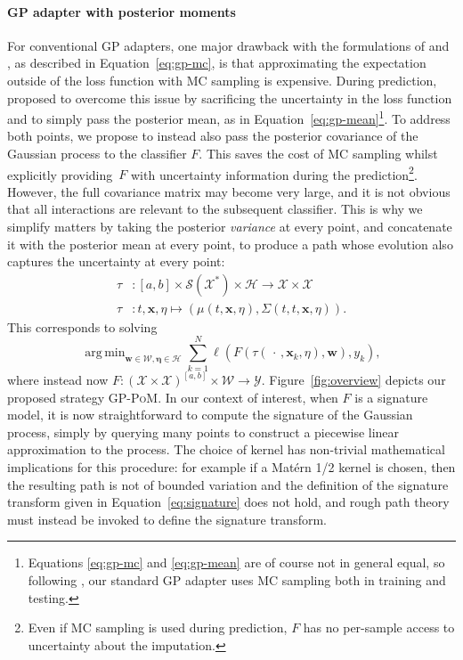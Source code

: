 \documentclass{article}
\DeclareMathOperator*{\argmin}{arg\,min}
\newcommand{\dataspace}{\mathcal{X}}
\newcommand{\lspace}{\mathcal{Y}}
\newcommand{\seriesspace}{\mathcal{S}}
\begin{document}
\paragraph{GP adapter with posterior moments}
%
For conventional GP adapters, one major drawback with the formulations
of \citet{li2016scalable} and \citet{futoma2017mgp}, as described in
Equation~\eqref{eq:gp-mc}, is that approximating the expectation outside
of the loss function with MC sampling is expensive.
%
During prediction, \citet{li2016scalable} proposed to overcome this
issue by sacrificing the uncertainty in the loss function and to simply
pass the posterior mean, as in Equation~\eqref{eq:gp-mean}\footnote{%
  Equations \eqref{eq:gp-mc} and \eqref{eq:gp-mean} are of course not in
  general equal, so following \citet{futoma2017mgp}, our standard GP
  adapter uses MC sampling both in training and testing.
}.
%
To address both points, we propose to instead also pass the posterior
covariance of the Gaussian process to the classifier $F$. This saves the
cost of MC sampling whilst explicitly providing~$F$ with uncertainty
information during the prediction\footnote{%
Even if MC sampling
is used during prediction, $F$ has no per-sample access to
uncertainty about the imputation.
}.
%
However, the full covariance matrix may become very large, and it is
not obvious that all interactions are relevant to the subsequent
classifier.
This is  why we simplify matters by taking the posterior
\emph{variance} at every point, and concatenate it with the posterior
mean at every point, to produce a path whose evolution also captures the
uncertainty at every point:
%
\begin{align}
    \tau &\colon [a, b] \times \seriesspace(\dataspace^*) \times \mathcal{H} \to \dataspace \times \dataspace\\
    \tau &\colon t, \mathbf{x}, \eta \mapsto (\mu(t, \mathbf{x}, \eta), \Sigma(t, t, \mathbf{x}, \eta)).
\end{align}
%
This corresponds to solving
%
\begin{equation}\label{eq:gp-moments}
\argmin_{\mathbf{w} \in \mathcal{W},\bm{\eta} \in \mathcal{H}} \sum_{k=1}^N \ell(F(\tau(\,\cdot\,,\mathbf{x}_k, \eta), \mathbf{w}), y_k),
\end{equation}
%
where instead now $F \colon (\dataspace \times \dataspace)^{[a, b]}
\times \mathcal{W} \to \lspace$.
%
Figure~\ref{fig:overview} depicts our proposed strategy \textsc{GP-PoM}. 
%
In our context of interest, when $F$ is a signature model, it is now
straightforward to compute the signature of the Gaussian process, simply
by querying many points to construct a piecewise linear approximation to
the process.  The choice of kernel has non-trivial mathematical
implications for this procedure: for example if a Mat{\'e}rn 1/2 kernel
is chosen, then the resulting path is not of bounded variation and the
definition of the signature transform given in Equation~\eqref{eq:signature}
does not hold, and rough path theory~\citep{lyons1998differential} must instead be invoked to define the
signature transform.
\end{document}
